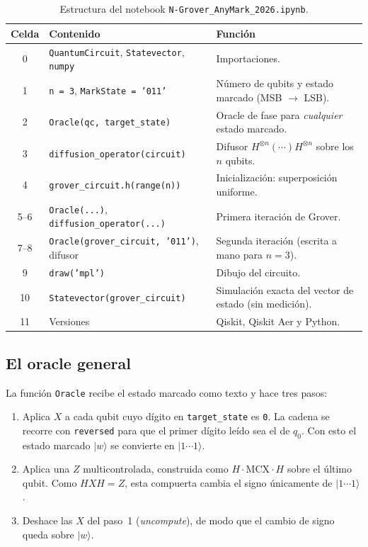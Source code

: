 \documentclass[11pt,a4paper]{article}
\providecommand{\ket}{}\renewcommand{\ket}[1]{\lvert #1\rangle}
\begin{document}
\begin{table}[H]
\centering
\small
\begin{tabularx}{\textwidth}{@{}c>{\raggedright}p{5.2cm}>{\raggedright\arraybackslash}X@{}}
\toprule
Celda & Contenido & Función\\
\midrule
0 & \texttt{QuantumCircuit}, \texttt{Statevector}, \texttt{numpy} & Importaciones.\\
1 & \texttt{n = 3}, \texttt{MarkState = '011'} & Número de qubits y estado marcado (MSB $\to$ LSB).\\
2 & \texttt{Oracle(qc, target\_state)} & Oracle de fase para \emph{cualquier} estado marcado.\\
3 & \texttt{diffusion\_operator(circuit)} & Difusor $H^{\otimes n}(\cdots)H^{\otimes n}$ sobre los $n$ qubits.\\
4 & \texttt{grover\_circuit.h(range(n))} & Inicialización: superposición uniforme.\\
5--6 & \texttt{Oracle(...)}, \texttt{diffusion\_operator(...)} & Primera iteración de Grover.\\
7--8 & \texttt{Oracle(grover\_circuit, '011')}, difusor & Segunda iteración (escrita a mano para $n=3$).\\
9 & \texttt{draw('mpl')} & Dibujo del circuito.\\
10 & \texttt{Statevector(grover\_circuit)} & Simulación exacta del vector de estado (sin medición).\\
11 & Versiones & Qiskit, Qiskit Aer y Python.\\
\bottomrule
\end{tabularx}
\caption{Estructura del notebook \texttt{N-Grover\_AnyMark\_2026.ipynb}.}
\label{tab:celdas}
\end{table}

\subsection{El oracle general}

La función \texttt{Oracle} recibe el estado marcado como texto y hace tres pasos:

\begin{enumerate}
\item Aplica $X$ a cada qubit cuyo dígito en \texttt{target\_state} es \texttt{0}. La cadena se
recorre con \texttt{reversed} para que el primer dígito leído sea el de $q_0$. Con esto el
estado marcado $\ket{w}$ se convierte en $\ket{1\cdots1}$.
\item Aplica una $Z$ multicontrolada, construida como $H\cdot\mathrm{MCX}\cdot H$ sobre el último
qubit. Como $HXH=Z$, esta compuerta cambia el signo únicamente de $\ket{1\cdots1}$.
\item Deshace las $X$ del paso~1 (\emph{uncompute}), de modo que el cambio de signo queda sobre $\ket{w}$.
\end{enumerate}
\end{document}

